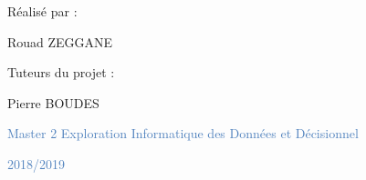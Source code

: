 \documentclass[12pt]{report}
\begin{document}
\vspace{\baselineskip}
{\fontsize{18pt}{21.6pt}\selectfont Réalisé par :\par}\par

{\fontsize{18pt}{21.6pt}\selectfont Rouad ZEGGANE\par}\par


\vspace{\baselineskip}

\vspace{\baselineskip}
{\fontsize{18pt}{21.6pt}\selectfont Tuteurs du projet :\par}\par

{\fontsize{18pt}{21.6pt}\selectfont Pierre BOUDES\par}\par


\vspace{\baselineskip}

\vspace{\baselineskip}

\vspace{\baselineskip}

\vspace{\baselineskip}
\tab 
\vspace{\baselineskip}
\vspace{\baselineskip}

{\fontsize{18pt}{21.6pt}\selectfont \begin{Center}\textcolor[HTML]{4F81BD}{Master 2 Exploration Informatique des Données et Décisionnel}\end{Center}\par}\par

{\fontsize{18pt}{21.6pt}\selectfont
\begin{Center}
\textcolor[HTML]{4F81BD}{2018/2019}\end{Center}\par}\par






\vspace{\baselineskip}
\setlength{\parskip}{0.0pt}

\vspace{\baselineskip}

\vspace{\baselineskip}
\end{document}
